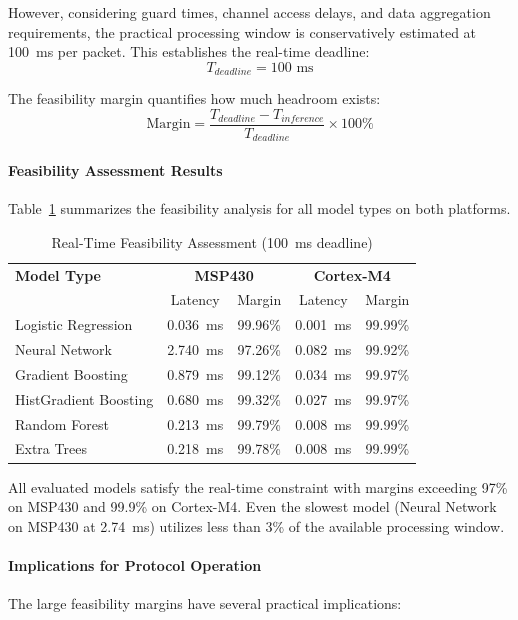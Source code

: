 However, considering guard times, channel access delays, and data aggregation requirements, the practical processing window is conservatively estimated at 100~ms per packet. This establishes the real-time deadline:
\begin{equation}
    T_{deadline} = 100 \text{ ms}
\end{equation}

The feasibility margin quantifies how much headroom exists:
\begin{equation}
    \text{Margin} = \frac{T_{deadline} - T_{inference}}{T_{deadline}} \times 100\%
\end{equation}

\paragraph{Feasibility Assessment Results}
Table~\ref{tab:feasibility} summarizes the feasibility analysis for all model types on both platforms.

\begin{table}[htbp]
\centering
\caption{Real-Time Feasibility Assessment (100~ms deadline)}
\label{tab:feasibility}
\begin{tabular}{lcccc}
\hline
\textbf{Model Type} & \multicolumn{2}{c}{\textbf{MSP430}} & \multicolumn{2}{c}{\textbf{Cortex-M4}} \\
 & Latency & Margin & Latency & Margin \\
\hline
Logistic Regression & 0.036~ms & 99.96\% & 0.001~ms & 99.99\% \\
Neural Network & 2.740~ms & 97.26\% & 0.082~ms & 99.92\% \\
Gradient Boosting & 0.879~ms & 99.12\% & 0.034~ms & 99.97\% \\
HistGradient Boosting & 0.680~ms & 99.32\% & 0.027~ms & 99.97\% \\
Random Forest & 0.213~ms & 99.79\% & 0.008~ms & 99.99\% \\
Extra Trees & 0.218~ms & 99.78\% & 0.008~ms & 99.99\% \\
\hline
\end{tabular}
\end{table}

All evaluated models satisfy the real-time constraint with margins exceeding 97\% on MSP430 and 99.9\% on Cortex-M4. Even the slowest model (Neural Network on MSP430 at 2.74~ms) utilizes less than 3\% of the available processing window.

\paragraph{Implications for Protocol Operation}
The large feasibility margins have several practical implications:

